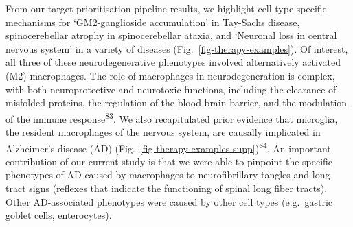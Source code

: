 \documentclass[
]{article}
\begin{document}
From our target prioritisation pipeline results, we highlight cell
type-specific mechanisms for `GM2-ganglioside accumulation' in Tay-Sachs
disease, spinocerebellar atrophy in spinocerebellar ataxia, and
`Neuronal loss in central nervous system' in a variety of diseases
(Fig.~\ref{fig-therapy-examples}). Of interest, all three of these
neurodegenerative phenotypes involved alternatively activated (M2)
macrophages. The role of macrophages in neurodegeneration is complex,
with both neuroprotective and neurotoxic functions, including the
clearance of misfolded proteins, the regulation of the blood-brain
barrier, and the modulation of the immune response\textsuperscript{83}.
We also recapitulated prior evidence that microglia, the resident
macrophages of the nervous system, are causally implicated in
Alzheimer's disease (AD)
(Fig.~\ref{fig-therapy-examples-supp})\textsuperscript{84}. An important
contribution of our current study is that we were able to pinpoint the
specific phenotypes of AD caused by macrophages to neurofibrillary
tangles and long-tract signs (reflexes that indicate the functioning of
spinal long fiber tracts). Other AD-associated phenotypes were caused by
other cell types (e.g.~gastric goblet cells, enterocytes).
\end{document}
